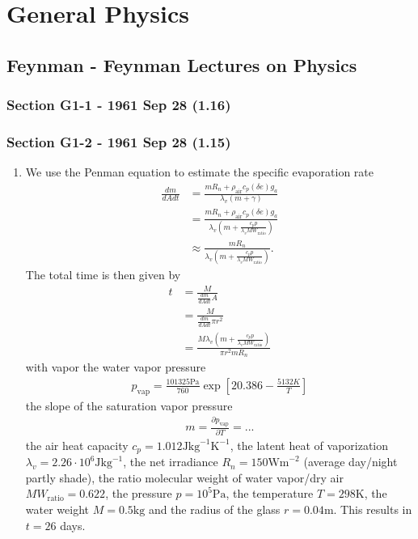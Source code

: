 \documentclass[10pt,a4paper]{article}
\theoremstyle{definition}
\begin{document}
\section{General Physics}

\subsection{{\sc Feynman} - Feynman Lectures on Physics}
\subsubsection{Section G1-1 - 1961 Sep 28 (1.16)}
\subsubsection{Section G1-2 - 1961 Sep 28 (1.15)}
\begin{enumerate}[label=(\alph*)]
\item  We use the Penman equation to estimate the specific evaporation rate
\begin{align}
    \frac{dm}{dA dt}
    &=\frac{m R_n + \rho_\text{air}c_p (\delta e)g_a}{\lambda_v(m+\gamma)}\\
    &=\frac{m R_n + \rho_\text{air}c_p (\delta e)g_a}{\lambda_v(m+\frac{c_p p}{\lambda_v MW_\text{ratio}})}\\
    &\approx\frac{m R_n}{\lambda_v(m+\frac{c_p p}{\lambda_v MW_\text{ratio}})}.
\end{align}
The total time is then given by
\begin{align}
    t&=\frac{M}{\frac{dm}{dA dt}A}\\
    &=\frac{M}{\frac{dm}{dA dt}\pi r^2}\\
    &=\frac{M\lambda_v(m+\frac{c_p p}{\lambda_v MW_\text{ratio}})}{\pi r^2 m R_n }
\end{align}
with vapor the water vapor pressure
\begin{align}
    p_\text{vap}=\frac{101325\text{Pa}}{760} \exp\left[20.386 - \frac{5132K}{T}\right]
\end{align}
the slope of the saturation vapor pressure
\begin{align}
    m=\frac{\partial p_\text{vap}}{\partial T}=...
\end{align}
the air heat capacity $c_p=1.012\text{J}\text{kg}^{-1}\text{K}^{-1}$, the latent heat of vaporization $\lambda_v=2.26\cdot10^6 \text{J}\text{kg}^{-1}$, the net irradiance $R_n=150\text{Wm}^{-2}$ (average day/night partly shade), the ratio molecular weight of water vapor/dry air $MW_\text{ratio}=0.622$, the pressure $p=10^5\text{Pa}$, the temperature $T= 298\text{K}$, the water weight $M=0.5\text{kg}$ and the radius of the glass $r=0.04\text{m}$. This results in $t=26$ days.


\end{enumerate}
\end{document}
